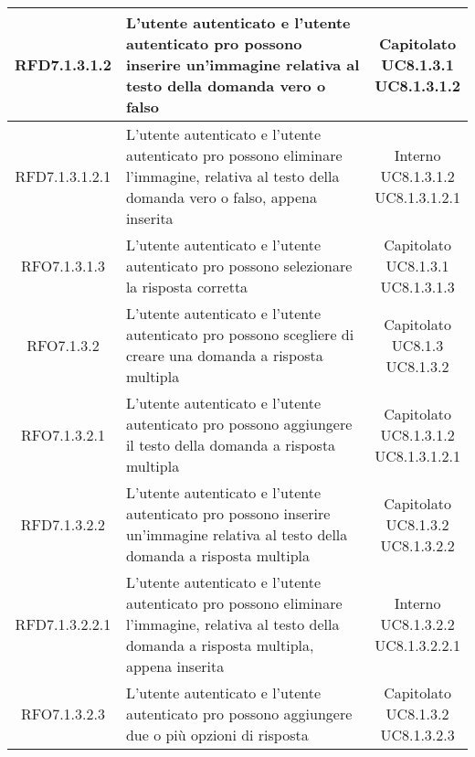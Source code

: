 \begin{longtable}{|c|>{\centering}m{7cm}|c|}
			 \hypertarget{{RFD7.1.3.1.2}}{{RFD7.1.3.1.2}} & L’utente autenticato e l'utente autenticato pro possono inserire un'immagine relativa al testo della domanda vero o falso & \makecell{Capitolato\\ UC8.1.3.1 \\UC8.1.3.1.2 } \\ \hline
			 \hypertarget{{RFD7.1.3.1.2.1}}{{RFD7.1.3.1.2.1}} & L’utente autenticato e l'utente autenticato pro possono eliminare l’immagine, relativa al testo della domanda vero o falso, appena inserita & \makecell{Interno\\ UC8.1.3.1.2 \\UC8.1.3.1.2.1 } \\ \hline
			 \hypertarget{{RFO7.1.3.1.3}}{{RFO7.1.3.1.3}} & L’utente autenticato e l'utente autenticato pro possono selezionare la risposta corretta  & \makecell{Capitolato\\ UC8.1.3.1 \\UC8.1.3.1.3 } \\ \hline
			 \hypertarget{{RFO7.1.3.2}}{{RFO7.1.3.2}} & L’utente autenticato e l’utente autenticato pro possono scegliere di creare una domanda a risposta multipla & \makecell{Capitolato\\ UC8.1.3 \\UC8.1.3.2 } \\ \hline
			 \hypertarget{{RFO7.1.3.2.1}}{{RFO7.1.3.2.1}} & L’utente autenticato e l'utente autenticato pro possono aggiungere il testo della domanda a risposta multipla  & \makecell{Capitolato\\ UC8.1.3.1.2 \\UC8.1.3.1.2.1 } \\ \hline
			 \hypertarget{{RFD7.1.3.2.2}}{{RFD7.1.3.2.2}} & L’utente autenticato e l'utente autenticato pro possono inserire un'immagine relativa al testo della domanda a risposta multipla  & \makecell{Capitolato\\ UC8.1.3.2 \\UC8.1.3.2.2 } \\ \hline
			 \hypertarget{{RFD7.1.3.2.2.1}}{{RFD7.1.3.2.2.1}} & L’utente autenticato e l'utente autenticato pro possono eliminare l’immagine, relativa al testo della domanda a risposta multipla, appena inserita & \makecell{Interno\\ UC8.1.3.2.2 \\UC8.1.3.2.2.1 } \\ \hline
			 \hypertarget{{RFO7.1.3.2.3}}{{RFO7.1.3.2.3}} & L’utente autenticato e l'utente autenticato pro possono aggiungere due o più opzioni di risposta & \makecell{Capitolato\\ UC8.1.3.2 \\UC8.1.3.2.3 } \\ \hline

\end{longtable}

